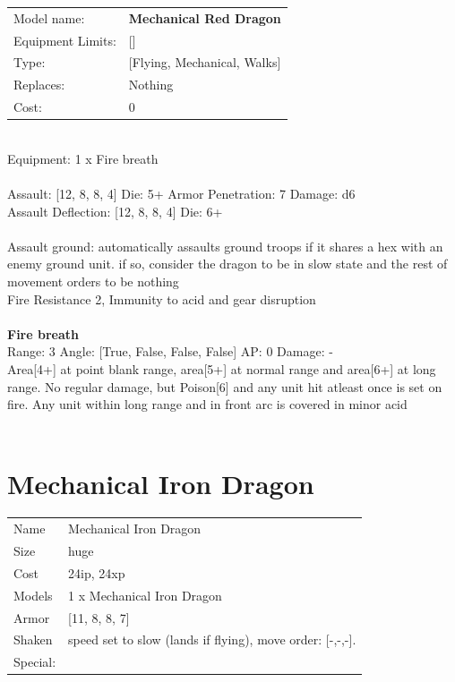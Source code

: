 \noindent
\begin{tabular}{ll}
Model name: &{\bf Mechanical Red Dragon } \\
Equipment Limits: &[] \\
Type: &[Flying, Mechanical, Walks] \\
Replaces: &Nothing \\
Cost: & 0\\
\end{tabular}
\ \\
Equipment: 1 x Fire breath \\
\ \\
Assault: [12, 8, 8, 4] Die: 5+ Armor Penetration: 7 Damage: d6 \\
Assault Deflection: [12, 8, 8, 4] Die: 6+\\
\indent  
\ \\
Assault ground: automatically assaults ground troops if it shares a hex with an enemy ground unit. if so, consider the dragon to be in slow state and the rest of movement orders to be nothing\\ 
Fire Resistance 2, Immunity to acid and gear disruption\\ 

\ \\
{\bf Fire breath } \\



Range: 3  Angle: [True, False, False, False] AP: 0 Damage: - \\
Area[4+] at point blank range, area[5+] at normal range and area[6+] at long range. No regular damage, but Poison[6] and any unit hit atleast once is set on fire. Any unit within long range and in front arc is covered in minor acid\\ 




 
\ \\













\clearpage

\section{ Mechanical Iron Dragon }

\begin{tabular}{ll}
  Name & Mechanical Iron Dragon \\
  Size & huge\\
  Cost & 24ip, 24xp\\
  Models & 1 x Mechanical Iron Dragon\\
  Armor & [11, 8, 8, 7]\\
  Shaken & speed set to slow (lands if flying), move order: [-,-,-].\\
  Special: \\
\end{tabular}

